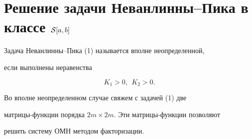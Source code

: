 \section{Решение задачи Неванлинны--Пика в классе ${\cal S}[a,b]$}





Задача Неванлинны--Пика (1) называется вполне неопределенной,


если выполнены неравенства


\begin{equation}


K_1 >0,\ \ K_2>0.


\end{equation}


Во вполне неопределенном случае свяжем с задачей (1) две


матрицы-функции порядка $2m\times 2m$. Эти матрицы-функции позволяют


решить систему ОМН методом факторизации.





